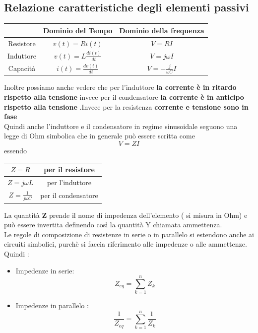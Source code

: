 \documentclass{article}
\theoremstyle{definition}
\begin{document}
\subsection{Relazione caratteristiche degli elementi passivi }
\begin{center}
\begin{tabular}{|c|c|c|}
	\hline
	\rule[-1ex]{0pt}{2.5ex}  &Dominio del Tempo  & Dominio della frequenza   \\
	\hline
	\rule[-1ex]{0pt}{2.5ex}  Resistore &$v(t)=Ri(t)$  & $V=RI$  \\
	\hline
	\rule[-1ex]{0pt}{2.5ex} Induttore  &$v(t)=L\frac{di(t)}{dt}$  &$V=j\omega I$  \\
	\hline
	\rule[-1ex]{0pt}{2.5ex}  Capacità &$i(t)=\frac{dv(t)}{dt}$  &$V=-\frac{j}{\omega C} I$ \\
	\hline
\end{tabular}
\end{center}
Inoltre possiamo anche vedere che per l'induttore \textbf{la corrente è in ritardo rispetto alla tensione} invece per il condensatore \textbf{la corrente è in anticipo rispetto alla tensione }.Invece per la resistenza \textbf{corrente e tensione sono in fase} \\
Quindi anche l'induttore e il condensatore in regime sinusoidale seguono una legge di Ohm simbolica che in generale può essere scritta come 
$$V=ZI$$ essendo 
\begin{center}
	
\begin{tabular}{|c|c|}
	\hline
	$Z=R$ & per il resistore \\
	\hline
	$Z=j\omega L$ &per l'induttore   \\
	\hline
	$Z=\frac{1}{j \omega C}$ &  per il condensatore \\
	\hline
\end{tabular}
\end{center}
La quantità \textbf{Z} prende il nome di impedenza dell'elemento ( si misura in Ohm)  e può essere invertita definendo così la quantità Y chiamata ammettenza.\\
Le regole di composizione di resistenze in serie o in parallelo si estendono anche ai circuiti simbolici, purchè si faccia riferimento alle impedenze o alle ammettenze. \\
Quindi : \begin{itemize}
	\item Impedenze in serie: 
	$$Z_{eq}=\sum_{k=1}^nZ_k$$
	\item Impedenze in parallelo :
	$$\frac{1}{Z_{eq}}=\sum_{k=1}^{n}\frac{1}{Z_k}$$
	\end{itemize}
\end{document}
